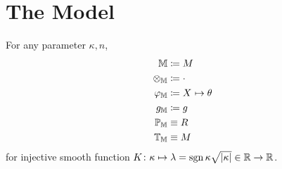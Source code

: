 \documentclass[../main.tex]{subfiles}
\begin{document}
\section{The Model}
\begin{ModelGroupElement}
For any parameter $\kappa, n$,
\begin{align*}
\elements&\coloneqq M\\
\groupoperation{\elements}&\coloneqq\cdot\\
\charts{\elements}&\coloneqq\tensor{X}{}\mapsto\tensor{\theta}{}\\
\innerprod{\elements}&\coloneqq g\\
\points{\elements}&\equiv R\\
\transformations{\elements}&\equiv M\\
\end{align*}
for injective smooth function $K\colon \kappa\mapsto \lambda=\operatorname{sgn}{\kappa}\sqrt{\lvert\kappa\rvert}\in\mathbb{R}\to\mathbb{R}$.
\end{ModelGroupElement}
\begin{ModelGroupAssertion}
\end{ModelGroupAssertion}
\begin{ModelCurvatureAssertion}
\end{ModelCurvatureAssertion}
\end{document}
